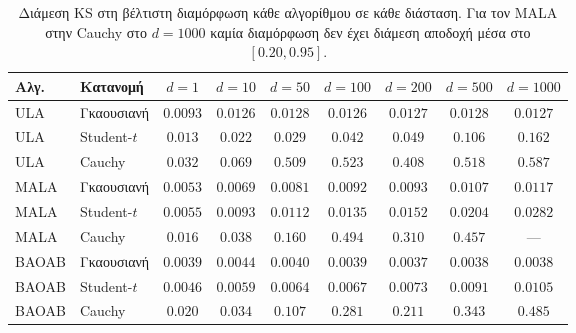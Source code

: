 \begin{table}[H]
\centering
\small
\begin{tabular}{llccccccc}
\toprule
Αλγ. & Κατανομή & $d{=}1$ & $d{=}10$ & $d{=}50$ & $d{=}100$ & $d{=}200$ & $d{=}500$ & $d{=}1000$ \\
\midrule
ULA   & Γκαουσιανή  & $0.0093$ & $0.0126$ & $0.0128$ & $0.0126$ & $0.0127$ & $0.0128$ & $0.0127$ \\
ULA   & Student-$t$ & $0.013$ & $0.022$ & $0.029$ & $0.042$ & $0.049$ & $0.106$ & $0.162$ \\
ULA   & Cauchy      & $0.032$ & $0.069$ & $0.509$ & $0.523$ & $0.408$ & $0.518$ & $0.587$ \\
MALA  & Γκαουσιανή  & $0.0053$ & $0.0069$ & $0.0081$ & $0.0092$ & $0.0093$ & $0.0107$ & $0.0117$ \\
MALA  & Student-$t$ & $0.0055$ & $0.0093$ & $0.0112$ & $0.0135$ & $0.0152$ & $0.0204$ & $0.0282$ \\
MALA  & Cauchy      & $0.016$ & $0.038$ & $0.160$ & $0.494$ & $0.310$ & $0.457$ & --- \\
BAOAB & Γκαουσιανή  & $0.0039$ & $0.0044$ & $0.0040$ & $0.0039$ & $0.0037$ & $0.0038$ & $0.0038$ \\
BAOAB & Student-$t$ & $0.0046$ & $0.0059$ & $0.0064$ & $0.0067$ & $0.0073$ & $0.0091$ & $0.0105$ \\
BAOAB & Cauchy      & $0.020$ & $0.034$ & $0.107$ & $0.281$ & $0.211$ & $0.343$ & $0.485$ \\
\bottomrule
\end{tabular}
\caption{Διάμεση KS στη βέλτιστη διαμόρφωση κάθε αλγορίθμου σε κάθε διάσταση.
Για τον MALA στην Cauchy στο $d=1000$ καμία διαμόρφωση δεν έχει διάμεση
αποδοχή μέσα στο $[0.20, 0.95]$.}
\label{tab:dim-scaling-numbers}
\end{table}

